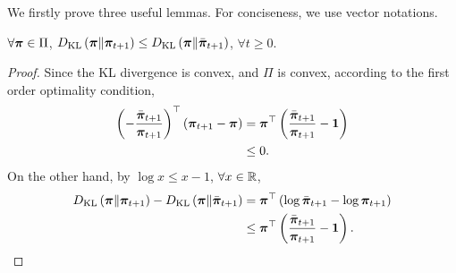 We firstly prove three useful lemmas. For conciseness, we use vector notations.

\begin{lem}
\label{lem:kl_difference_non_positive}
$\forall {\boldsymbol{\pi}} \in \Pi$, $D_{\mathrm{KL}}\left( {\boldsymbol{\pi}} \middle\| {\boldsymbol{\pi}}_{t+1} \right) \le D_{\mathrm{KL}}\left( {\boldsymbol{\pi}} \middle\| \bar{{\boldsymbol{\pi}}}_{t+1} \right)$, $\forall t \ge 0$.
\end{lem}
\begin{proof}
Since the KL divergence is convex, and $\Pi$ is convex, according to the first order optimality condition,
\begin{equation*}
\begin{split}
    \left( - \frac{\bar{{\boldsymbol{\pi}}}_{t+1}}{{\boldsymbol{\pi}}_{t+1}} \right)^\top \left( {\boldsymbol{\pi}}_{t+1} - {\boldsymbol{\pi}} \right) &= {\boldsymbol{\pi}}^\top \left( \frac{\bar{{\boldsymbol{\pi}}}_{t+1}}{{\boldsymbol{\pi}}_{t+1}} - {\mathbf{1}} \right) \\
    &\le 0.
\end{split}
\end{equation*}
On the other hand, by $\log{x} \le x - 1$, $\forall x \in {\mathbb{R}}$,
\begin{equation*}
\begin{split}
    D_{\mathrm{KL}}\left( {\boldsymbol{\pi}} \middle\| {\boldsymbol{\pi}}_{t+1} \right) - D_{\mathrm{KL}}\left( {\boldsymbol{\pi}} \middle\| \bar{{\boldsymbol{\pi}}}_{t+1} \right) &= {\boldsymbol{\pi}}^\top \left( \log{\bar{{\boldsymbol{\pi}}}_{t+1}} - \log{{\boldsymbol{\pi}}_{t+1}} \right) \\
    &\le {\boldsymbol{\pi}}^\top \left( \frac{\bar{{\boldsymbol{\pi}}}_{t+1}}{{\boldsymbol{\pi}}_{t+1}} - {\mathbf{1}} \right). \qedhere
\end{split}
\end{equation*}
\end{proof}

